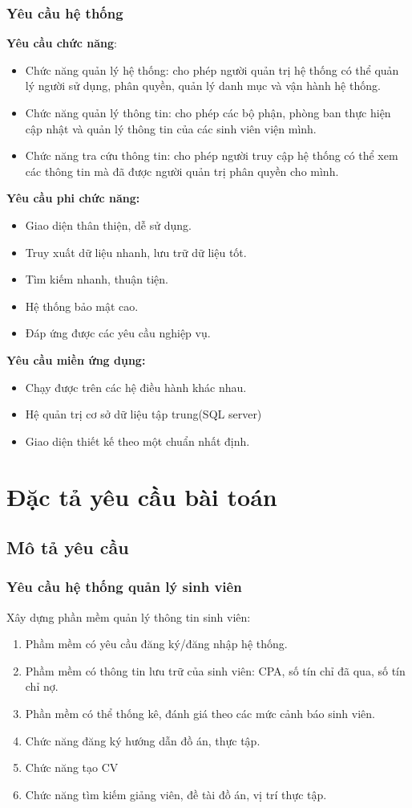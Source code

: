 \subsection{Yêu cầu hệ thống}
\textbf{Yêu cầu chức năng}:
\begin{itemize}
  \item Chức năng quản lý hệ thống: cho phép người quản trị hệ thống có thể quản lý người sử dụng, phân quyền, quản lý danh mục và vận hành hệ thống.
  \item Chức năng quản lý thông tin: cho phép các bộ phận, phòng ban thực hiện cập nhật và quản lý thông tin của các sinh viên viện mình.
  \item Chức năng tra cứu thông tin: cho phép người truy cập hệ thống có thể xem các thông tin mà đã được người quản trị phân quyền cho mình.
\end{itemize}
\textbf{Yêu cầu phi chức năng:}
\begin{itemize}
  \item Giao diện thân thiện, dễ sử dụng.
  \item Truy xuất dữ liệu nhanh, lưu trữ dữ liệu tốt.
  \item Tìm kiếm nhanh, thuận tiện.
  \item Hệ thống bảo mật cao.
  \item Đáp ứng được các yêu cầu nghiệp vụ.
\end{itemize}
\textbf{Yêu cầu miền ứng dụng:}
\begin{itemize}
  \item Chạy được trên các hệ điều hành khác nhau.
  \item Hệ quản trị cơ sở dữ liệu tập trung(SQL server)
  \item Giao diện thiết kế theo một chuẩn nhất định.
\end{itemize}

\chapter{Đặc tả yêu cầu bài toán}
\section{Mô tả yêu cầu}
\subsection{Yêu cầu hệ thống quản lý sinh viên}
Xây dựng phần mềm quản lý thông tin sinh viên:
\begin{enumerate}
	\item Phầm mềm có yêu cầu đăng ký/đăng nhập hệ thống.
	\item Phầm mềm có thông tin lưu trữ của sinh viên: CPA, số tín chỉ đã qua, số tín chỉ nợ.
	\item Phần mềm có thể thống kê, đánh giá theo các mức cảnh báo sinh viên.
	\item Chức năng đăng ký hướng dẫn đồ án, thực tập.
	\item Chức năng tạo CV
	\item Chức năng tìm kiếm giảng viên, đề tài đồ án, vị trí thực tập.
\end{enumerate}

